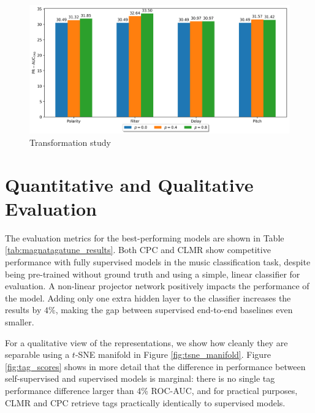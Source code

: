 \begin{figure}[t]
    \centering
    \includegraphics[width=\columnwidth]{figs/transformation_probabilities.png}
    \caption{Transformation study}
    \label{fig:transformation_probabilities}
\end{figure}





\section{Quantitative and Qualitative Evaluation}
The evaluation metrics for the best-performing models are shown in Table \ref{tab:magnatagatune_results}. Both CPC and CLMR show competitive performance with fully supervised models in the music classification task, despite being pre-trained without ground truth and using a simple, linear classifier for evaluation. A non-linear projector network positively impacts the performance of the model. Adding only one extra hidden layer to the classifier increases the results by $4\%$, making the gap between supervised end-to-end baselines even smaller.

For a qualitative view of the representations, we show how cleanly they are  separable using a $t$-SNE manifold in Figure \ref{fig:tsne_manifold}. Figure \ref{fig:tag_scores} shows in more detail that the difference in performance between self-supervised and supervised models is marginal: there is no single tag performance difference larger than 4\% ROC-AUC, and for practical purposes, CLMR and CPC retrieve tags practically identically to supervised models.

